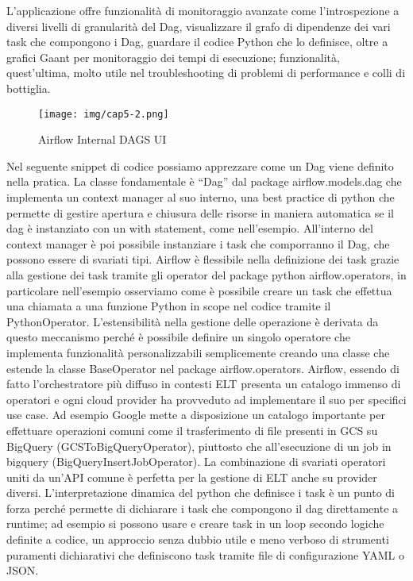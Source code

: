 \documentclass[a4paper,12pt]{report}
\begin{document}
\noindent
L’applicazione  offre funzionalità di monitoraggio avanzate come l’introspezione a diversi livelli di granularità del Dag, visualizzare il grafo di dipendenze dei vari task che compongono i Dag, guardare il codice Python che lo definisce, oltre a  grafici Gaant per monitoraggio dei tempi di esecuzione; funzionalità, quest’ultima, molto utile nel troubleshooting di problemi di performance e colli di bottiglia.

\begin{figure}[h]
    \centering
    \texttt{[image: img/cap5-2.png]}
    \caption{Airflow Internal DAGS UI}
\end{figure}

\noindent
Nel seguente snippet di codice possiamo apprezzare come un Dag viene definito nella pratica.
La classe fondamentale è “Dag” dal package airflow.models.dag che implementa un context manager al suo interno, una best practice di python che permette di gestire apertura e chiusura delle risorse in maniera automatica se il dag è instanziato con un with statement, come nell’esempio.
All’interno del context manager è poi possibile instanziare i task che comporranno il Dag, che possono essere di svariati tipi.  Airflow è flessibile nella definizione dei task grazie alla gestione dei task tramite gli operator del package python airflow.operators, in particolare nell’esempio osserviamo come è possibile creare un task che effettua una chiamata a una funzione Python in scope nel codice tramite il PythonOperator. L’estensibilità nella gestione delle operazione è derivata da questo meccanismo perché è possibile definire un singolo operatore che implementa funzionalità personalizzabili semplicemente creando una classe che estende la classe BaseOperator nel package airflow.operators. 
Airflow, essendo di fatto l’orchestratore più diffuso in contesti ELT presenta un catalogo immenso di operatori e ogni cloud provider ha provveduto ad implementare il suo per specifici use case.
Ad esempio Google mette a disposizione un catalogo importante per effettuare operazioni comuni come il trasferimento di file presenti in GCS su BigQuery (GCSToBigQueryOperator), 
piuttosto che all’esecuzione di un job in bigquery (BigQueryInsertJobOperator). La combinazione di svariati operatori uniti da un’API comune è perfetta per la gestione di ELT anche su provider diversi.
L’interpretazione dinamica del python che definisce i task è un punto di forza perché permette di dichiarare i task che compongono il dag direttamente a runtime; ad esempio si possono usare e creare task in un loop secondo logiche definite a codice, un approccio senza dubbio utile e meno verboso di strumenti puramenti dichiarativi che definiscono task tramite file di configurazione YAML o JSON.
\end{document}
